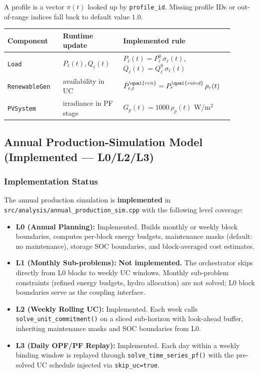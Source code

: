 A profile is a vector \(\pi(t)\) looked up by \texttt{profile\_id}.  Missing
profile IDs or out-of-range indices fall back to default value \(1.0\).

\begin{longtable}{L{0.23\linewidth}L{0.25\linewidth}L{0.42\linewidth}}
\toprule
Component & Runtime update & Implemented rule \\
\midrule
\endhead
\texttt{Load} & \(P_{\ell}(t),Q_{\ell}(t)\) &
\(P_{\ell}(t)=P_{\ell}^0\,\sigma_{\ell}(t)\),
\(Q_{\ell}(t)=Q_{\ell}^0\,\sigma_{\ell}(t)\) \\
\texttt{RenewableGen} & availability in UC &
\(\bar P^{\qual{ren}}_{r,t}=P^{\qual{rated}}_r\,\rho_r(t)\) \\
\texttt{PVSystem} & irradiance in PF stage &
\(G_p(t)=1000\,\rho_p(t)\) W/m\(^2\) \\
\bottomrule
\end{longtable}

\subsection{Annual Production-Simulation Model (Implemented --- L0/L2/L3)}
\label{sec:annual-production-sim}

\subsubsection{Implementation Status}

The annual production simulation is \textbf{implemented} in
\texttt{src/analysis/annual\_production\_sim.cpp} with the following level
coverage:
\begin{itemize}
\item \textbf{L0 (Annual Planning):} Implemented.  Builds monthly or weekly
  block boundaries, computes per-block energy budgets, maintenance masks
  (default: no maintenance), storage SOC boundaries, and block-averaged cost
  estimates.
\item \textbf{L1 (Monthly Sub-problems):} \textbf{Not implemented.}  The
  orchestrator skips directly from L0 blocks to weekly UC windows.  Monthly
  sub-problem constraints (refined energy budgets, hydro allocation) are not
  solved; L0 block boundaries serve as the coupling interface.
\item \textbf{L2 (Weekly Rolling UC):} Implemented.  Each week calls
  \texttt{solve\_unit\_commitment()} on a sliced sub-horizon with look-ahead
  buffer, inheriting maintenance masks and SOC boundaries from L0.
\item \textbf{L3 (Daily OPF/PF Replay):} Implemented.  Each day within a
  weekly binding window is replayed through \texttt{solve\_time\_series\_pf()}
  with the pre-solved UC schedule injected via \texttt{skip\_uc=true}.
\end{itemize}


